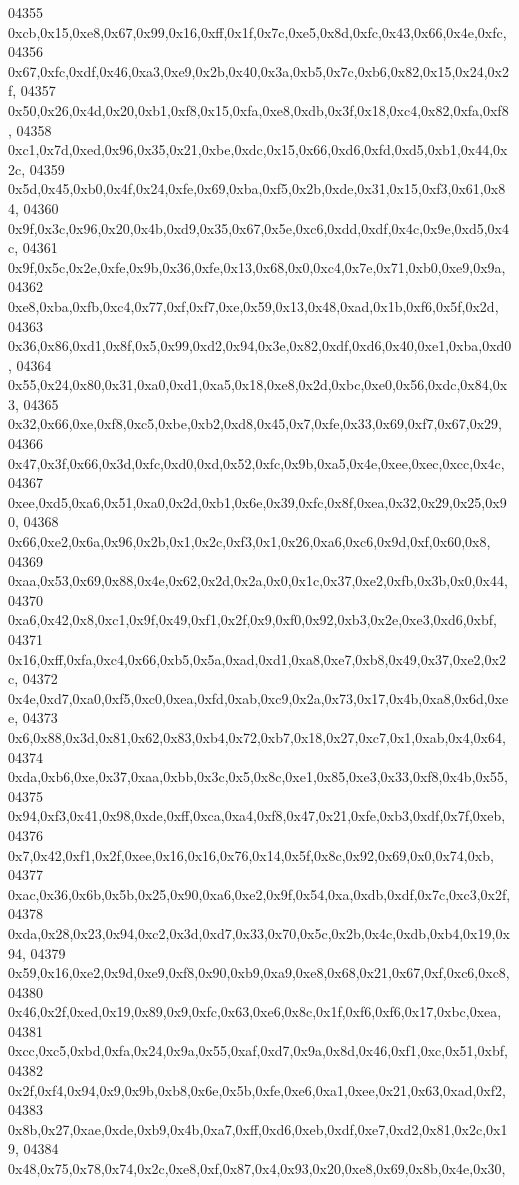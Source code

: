 \begin{DoxyCode}
04355   0xcb,0x15,0xe8,0x67,0x99,0x16,0xff,0x1f,0x7c,0xe5,0x8d,0xfc,0x43,0x66,0x4e,0xfc,
04356   0x67,0xfc,0xdf,0x46,0xa3,0xe9,0x2b,0x40,0x3a,0xb5,0x7c,0xb6,0x82,0x15,0x24,0x2f,
04357   0x50,0x26,0x4d,0x20,0xb1,0xf8,0x15,0xfa,0xe8,0xdb,0x3f,0x18,0xc4,0x82,0xfa,0xf8,
04358   0xc1,0x7d,0xed,0x96,0x35,0x21,0xbe,0xdc,0x15,0x66,0xd6,0xfd,0xd5,0xb1,0x44,0x2c,
04359   0x5d,0x45,0xb0,0x4f,0x24,0xfe,0x69,0xba,0xf5,0x2b,0xde,0x31,0x15,0xf3,0x61,0x84,
04360   0x9f,0x3c,0x96,0x20,0x4b,0xd9,0x35,0x67,0x5e,0xc6,0xdd,0xdf,0x4c,0x9e,0xd5,0x4c,
04361   0x9f,0x5c,0x2e,0xfe,0x9b,0x36,0xfe,0x13,0x68,0x0,0xc4,0x7e,0x71,0xb0,0xe9,0x9a,
04362   0xe8,0xba,0xfb,0xc4,0x77,0xf,0xf7,0xe,0x59,0x13,0x48,0xad,0x1b,0xf6,0x5f,0x2d,
04363   0x36,0x86,0xd1,0x8f,0x5,0x99,0xd2,0x94,0x3e,0x82,0xdf,0xd6,0x40,0xe1,0xba,0xd0,
04364   0x55,0x24,0x80,0x31,0xa0,0xd1,0xa5,0x18,0xe8,0x2d,0xbc,0xe0,0x56,0xdc,0x84,0x3,
04365   0x32,0x66,0xe,0xf8,0xc5,0xbe,0xb2,0xd8,0x45,0x7,0xfe,0x33,0x69,0xf7,0x67,0x29,
04366   0x47,0x3f,0x66,0x3d,0xfc,0xd0,0xd,0x52,0xfc,0x9b,0xa5,0x4e,0xee,0xec,0xcc,0x4c,
04367   0xee,0xd5,0xa6,0x51,0xa0,0x2d,0xb1,0x6e,0x39,0xfc,0x8f,0xea,0x32,0x29,0x25,0x90,
04368   0x66,0xe2,0x6a,0x96,0x2b,0x1,0x2c,0xf3,0x1,0x26,0xa6,0xc6,0x9d,0xf,0x60,0x8,
04369   0xaa,0x53,0x69,0x88,0x4e,0x62,0x2d,0x2a,0x0,0x1c,0x37,0xe2,0xfb,0x3b,0x0,0x44,
04370   0xa6,0x42,0x8,0xc1,0x9f,0x49,0xf1,0x2f,0x9,0xf0,0x92,0xb3,0x2e,0xe3,0xd6,0xbf,
04371   0x16,0xff,0xfa,0xc4,0x66,0xb5,0x5a,0xad,0xd1,0xa8,0xe7,0xb8,0x49,0x37,0xe2,0x2c,
04372   0x4e,0xd7,0xa0,0xf5,0xc0,0xea,0xfd,0xab,0xc9,0x2a,0x73,0x17,0x4b,0xa8,0x6d,0xee,
04373   0x6,0x88,0x3d,0x81,0x62,0x83,0xb4,0x72,0xb7,0x18,0x27,0xc7,0x1,0xab,0x4,0x64,
04374   0xda,0xb6,0xe,0x37,0xaa,0xbb,0x3c,0x5,0x8c,0xe1,0x85,0xe3,0x33,0xf8,0x4b,0x55,
04375   0x94,0xf3,0x41,0x98,0xde,0xff,0xca,0xa4,0xf8,0x47,0x21,0xfe,0xb3,0xdf,0x7f,0xeb,
04376   0x7,0x42,0xf1,0x2f,0xee,0x16,0x16,0x76,0x14,0x5f,0x8c,0x92,0x69,0x0,0x74,0xb,
04377   0xac,0x36,0x6b,0x5b,0x25,0x90,0xa6,0xe2,0x9f,0x54,0xa,0xdb,0xdf,0x7c,0xc3,0x2f,
04378   0xda,0x28,0x23,0x94,0xc2,0x3d,0xd7,0x33,0x70,0x5c,0x2b,0x4c,0xdb,0xb4,0x19,0x94,
04379   0x59,0x16,0xe2,0x9d,0xe9,0xf8,0x90,0xb9,0xa9,0xe8,0x68,0x21,0x67,0xf,0xc6,0xc8,
04380   0x46,0x2f,0xed,0x19,0x89,0x9,0xfc,0x63,0xe6,0x8c,0x1f,0xf6,0xf6,0x17,0xbc,0xea,
04381   0xcc,0xc5,0xbd,0xfa,0x24,0x9a,0x55,0xaf,0xd7,0x9a,0x8d,0x46,0xf1,0xc,0x51,0xbf,
04382   0x2f,0xf4,0x94,0x9,0x9b,0xb8,0x6e,0x5b,0xfe,0xe6,0xa1,0xee,0x21,0x63,0xad,0xf2,
04383   0x8b,0x27,0xae,0xde,0xb9,0x4b,0xa7,0xff,0xd6,0xeb,0xdf,0xe7,0xd2,0x81,0x2c,0x19,
04384   0x48,0x75,0x78,0x74,0x2c,0xe8,0xf,0x87,0x4,0x93,0x20,0xe8,0x69,0x8b,0x4e,0x30,

\end{DoxyCode}
